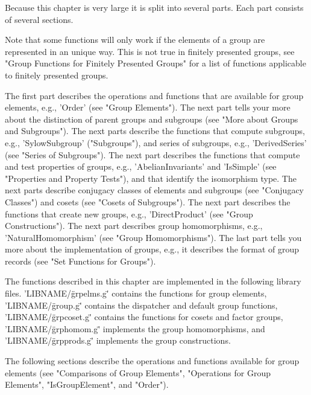 Because this chapter is very large it  is split into several parts.  Each
part consists of several sections.

Note  that  some functions will only work if the elements of a  group are
represented in an  unique  way.  This  is not true  in finitely presented
groups, see "Group Functions for Finitely Presented Groups" for a list of
functions applicable to finitely presented groups.

The first part describes the operations and functions  that are available
for group elements, e.g., 'Order' (see "Group Elements").   The next part
tells your more about the distinction of parent groups and subgroups (see
"More  about  Groups  and  Subgroups").   The  next  parts  describe  the
functions  that compute subgroups, e.g.,  'SylowSubgroup'  ("Subgroups"),
and   series   of  subgroups,  e.g.,  'DerivedSeries'   (see  "Series  of
Subgroups").  The next part describes the functions that compute and test
properties  of  groups,  e.g.,  'AbelianInvariants' and  'IsSimple'  (see
"Properties and Property Tests"), and that identify the isomorphism type.
The next parts describe conjugacy classes of elements and  subgroups (see
"Conjugacy  Classes") and  cosets (see "Cosets of  Subgroups").  The next
part   describes    the   functions  that   create  new   groups,   e.g.,
'DirectProduct' (see  "Group   Constructions").  The  next part describes
group    homomorphisms,   e.g.,   'NaturalHomomorphism'    (see    "Group
Homomorphisms").  The last part tells you more  about  the implementation
of   groups,  e.g., it describes  the format  of group  records (see "Set
Functions for Groups").

The functions described in this chapter are  implemented in the following
library files.  'LIBNAME/\"grpelms.g\"' contains the functions for  group
elements, 'LIBNAME/\"group.g\"' contains the dispatcher and default group
functions, 'LIBNAME/\"grpcoset.g\"' contains the functions for cosets and
factor    groups,   'LIBNAME/\"grphomom.g\"'   implements    the    group
homomorphisms,   and  'LIBNAME/\"grpprods.g\"'   implements   the   group
constructions.



The following  sections  describe the operations and  functions available
for group  elements (see "Comparisons of Group Elements", "Operations for
Group Elements", "IsGroupElement", and "Order").

